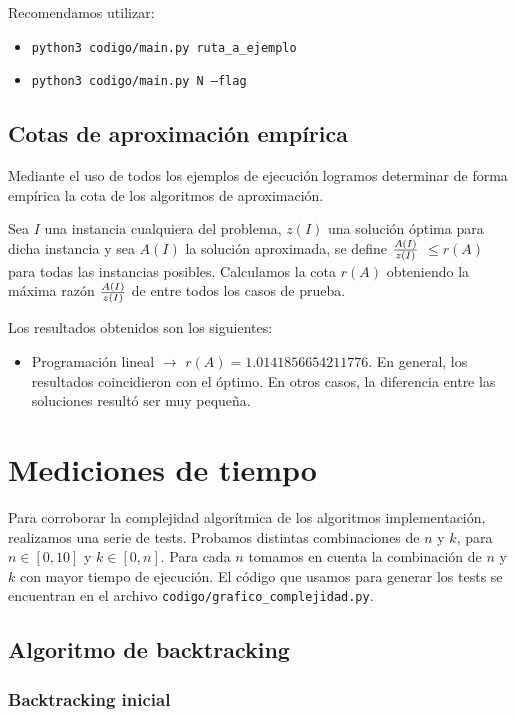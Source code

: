 \documentclass{article}
\begin{document}
Recomendamos utilizar:
\begin{itemize}
    \item \texttt{python3\ codigo/main.py\ ruta\_a\_ejemplo}
    \item \texttt{python3\ codigo/main.py\ N\ --flag}
\end{itemize}

\subsection{Cotas de aproximación empírica}

Mediante el uso de todos los ejemplos de ejecución logramos determinar de forma empírica la cota de los algoritmos de aproximación. 

Sea \(I\) una instancia cualquiera del problema, \(z(I)\) una solución óptima para dicha instancia y sea \(A(I)\) la solución aproximada, se define \(A(I) \over z(I)\) \(\leq r(A)\) para todas las instancias posibles. Calculamos la cota $r(A)$ obteniendo la máxima razón \(A(I) \over z(I)\) de entre todos los casos de prueba.

Los resultados obtenidos son los siguientes:
\begin{itemize}
    \item Programación lineal $\rightarrow$ $r(A) = 1.0141856654211776$. En general, los resultados coincidieron con el óptimo. En otros casos, la diferencia entre las soluciones resultó ser muy pequeña.
\end{itemize}



\section{Mediciones de tiempo}
\label{sec:medTiempo}
Para corroborar la complejidad algorítmica de los algoritmos implementación, realizamos una serie de tests. Probamos distintas combinaciones de $n$ y $k$, para $n \in [0, 10]$ y $k \in [0, n]$. Para cada $n$ tomamos en cuenta la combinación de $n$ y $k$ con mayor tiempo de ejecución. El código que usamos para generar los tests se encuentran en el archivo 
\texttt{codigo/grafico\_complejidad.py}.

\subsection{Algoritmo de backtracking}
\subsubsection{Backtracking inicial}
\end{document}
